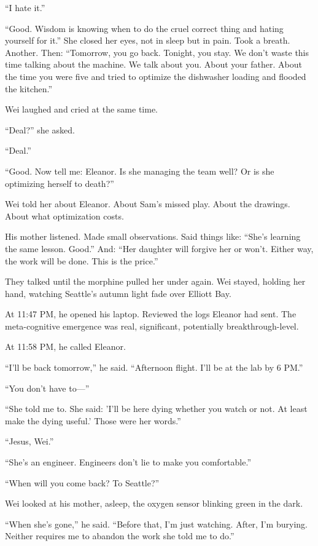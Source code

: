 ``I hate it.''

``Good. Wisdom is knowing when to do the cruel correct thing and hating yourself for it.'' She closed her eyes, not in sleep but in pain. Took a breath. Another. Then: ``Tomorrow, you go back. Tonight, you stay. We don't waste this time talking about the machine. We talk about you. About your father. About the time you were five and tried to optimize the dishwasher loading and flooded the kitchen.''

Wei laughed and cried at the same time.

``Deal?'' she asked.

``Deal.''

``Good. Now tell me: Eleanor. Is she managing the team well? Or is she optimizing herself to death?''

Wei told her about Eleanor. About Sam's missed play. About the drawings. About what optimization costs.

His mother listened. Made small observations. Said things like: ``She's learning the same lesson. Good.'' And: ``Her daughter will forgive her or won't. Either way, the work will be done. This is the price.''

They talked until the morphine pulled her under again. Wei stayed, holding her hand, watching Seattle's autumn light fade over Elliott Bay.

At 11:47 PM, he opened his laptop. Reviewed the logs Eleanor had sent. The meta-cognitive emergence was real, significant, potentially breakthrough-level.

At 11:58 PM, he called Eleanor.

``I'll be back tomorrow,'' he said. ``Afternoon flight. I'll be at the lab by 6 PM.''

``You don't have to---''

``She told me to. She said: 'I'll be here dying whether you watch or not. At least make the dying useful.' Those were her words.''

``Jesus, Wei.''

``She's an engineer. Engineers don't lie to make you comfortable.''

``When will you come back? To Seattle?''

Wei looked at his mother, asleep, the oxygen sensor blinking green in the dark.

``When she's gone,'' he said. ``Before that, I'm just watching. After, I'm burying. Neither requires me to abandon the work she told me to do.''

